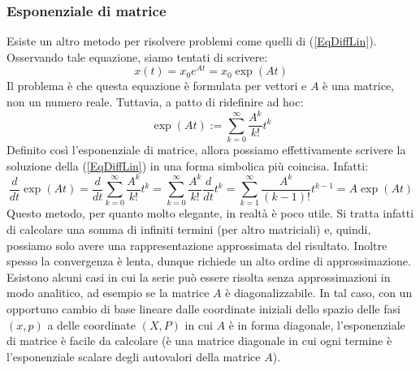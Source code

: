 \documentclass[a4paper,openany]{article}
\begin{document}
	\subsubsection{Esponenziale di matrice}
	Esiste un altro metodo per risolvere problemi come quelli di (\ref{EqDiffLin}). Osservando tale equazione, siamo tentati di scrivere:
	\begin{equation}
		x(t) = x_{0}e^{At} = x_{0}\exp(At)
		\label{ExpMatr}
	\end{equation}
	Il problema è che questa equazione è formulata per vettori e $A$ è una matrice, non un numero reale. Tuttavia, a patto di ridefinire ad hoc:
	$$
	\exp(At) := \sum_{k=0}^{\infty}\dfrac{A^{k
	}}{k!}t^{k}
	$$
	Definito così l'esponenziale di matrice, allora possiamo effettivamente scrivere la soluzione della (\ref{EqDiffLin}) in una forma simbolica più coincisa. Infatti:
	$$
	\dfrac{d}{dt} \exp(At) = \dfrac{d}{dt}\sum_{k=0}^{\infty}\dfrac{A^{k
	}}{k!}t^{k} = \sum_{k=0}^{\infty}\dfrac{A^{k
	}}{k!}\dfrac{d}{dt}t^{k} = \sum_{k=1}^{\infty}\dfrac{A^{k
	}}{(k-1)!}t^{k-1} = A \exp(At)
	$$
	Questo metodo, per quanto molto elegante, in realtà è poco utile. Si tratta infatti di calcolare una somma di infiniti termini (per altro matriciali) e, quindi, possiamo solo avere una rappresentazione approssimata del risultato. Inoltre spesso la convergenza è lenta, dunque richiede un alto ordine di approssimazione. Esistono alcuni casi in cui la serie può essere risolta senza approssimazioni in modo analitico, ad esempio se la matrice $A$ è diagonalizzabile. In tal caso, con un opportuno cambio di base lineare dalle coordinate iniziali dello spazio delle fasi $(x,p)$ a delle coordinate $(X,P)$ in cui $A$ è in forma diagonale, l'esponenziale di matrice è facile da calcolare (è una matrice diagonale in cui ogni termine è l'esponenziale scalare degli autovalori della matrice $A$).
	
\end{document}
